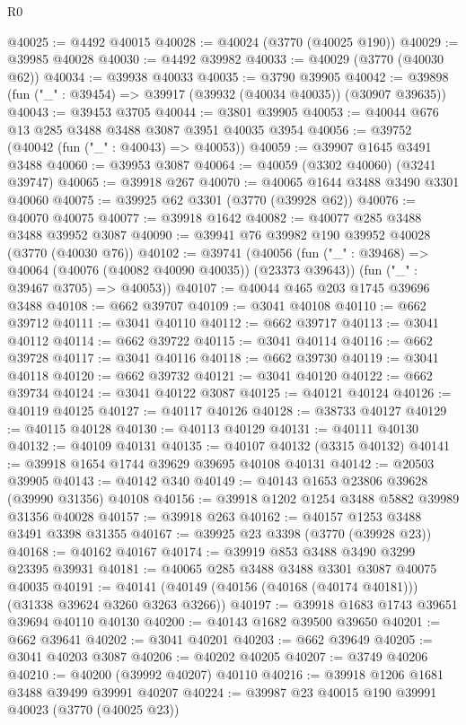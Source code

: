 \begin{lexlean}{R0}
\begin{coremodule}
@40025 := @4492 @40015
@40028 := @40024 (@3770 (@40025 @190))
@40029 := @39985 @40028
@40030 := @4492 @39982
@40033 := @40029 (@3770 (@40030 @62))
@40034 := @39938 @40033
@40035 := @3790 @39905
@40042 := @39898 (fun ("_" : @39454) => @39917 (@39932 (@40034 @40035)) (@30907 @39635))
@40043 := @39453 @3705
@40044 := @3801 @39905
@40053 := @40044 @676 @13 @285 @3488 @3488 @3087 @3951 @40035 @3954
@40056 := @39752 (@40042 (fun ("_" : @40043) => @40053))
@40059 := @39907 @1645 @3491 @3488
@40060 := @39953 @3087
@40064 := @40059 (@3302 @40060) (@3241 @39747)
@40065 := @39918 @267
@40070 := @40065 @1644 @3488 @3490 @3301 @40060
@40075 := @39925 @62 @3301 (@3770 (@39928 @62))
@40076 := @40070 @40075
@40077 := @39918 @1642
@40082 := @40077 @285 @3488 @3488 @39952 @3087
@40090 := @39941 @76 @39982 @190 @39952 @40028 (@3770 (@40030 @76))
@40102 := @39741
    (@40056
      (fun ("_" : @39468) => @40064 (@40076 (@40082 @40090 @40035)) (@23373 @39643))
      (fun ("_" : @39467 @3705) => @40053))
@40107 := @40044 @465 @203 @1745 @39696 @3488
@40108 := @662 @39707
@40109 := @3041 @40108
@40110 := @662 @39712
@40111 := @3041 @40110
@40112 := @662 @39717
@40113 := @3041 @40112
@40114 := @662 @39722
@40115 := @3041 @40114
@40116 := @662 @39728
@40117 := @3041 @40116
@40118 := @662 @39730
@40119 := @3041 @40118
@40120 := @662 @39732
@40121 := @3041 @40120
@40122 := @662 @39734
@40124 := @3041 @40122 @3087
@40125 := @40121 @40124
@40126 := @40119 @40125
@40127 := @40117 @40126
@40128 := @38733 @40127
@40129 := @40115 @40128
@40130 := @40113 @40129
@40131 := @40111 @40130
@40132 := @40109 @40131
@40135 := @40107 @40132 (@3315 @40132)
@40141 := @39918 @1654 @1744 @39629 @39695 @40108 @40131
@40142 := @20503 @39905
@40143 := @40142 @340
@40149 := @40143 @1653 @23806 @39628 (@39990 @31356) @40108
@40156 := @39918 @1202 @1254 @3488 @5882 @39989 @31356 @40028
@40157 := @39918 @263
@40162 := @40157 @1253 @3488 @3491 @3398 @31355
@40167 := @39925 @23 @3398 (@3770 (@39928 @23))
@40168 := @40162 @40167
@40174 := @39919 @853 @3488 @3490 @3299 @23395 @39931
@40181 := @40065 @285 @3488 @3488 @3301 @3087 @40075 @40035
@40191 := @40141 (@40149 (@40156 (@40168 (@40174 @40181))) (@31338 @39624 @3260 @3263 @3266))
@40197 := @39918 @1683 @1743 @39651 @39694 @40110 @40130
@40200 := @40143 @1682 @39500 @39650
@40201 := @662 @39641
@40202 := @3041 @40201
@40203 := @662 @39649
@40205 := @3041 @40203 @3087
@40206 := @40202 @40205
@40207 := @3749 @40206
@40210 := @40200 (@39992 @40207) @40110
@40216 := @39918 @1206 @1681 @3488 @39499 @39991 @40207
@40224 := @39987 @23 @40015 @190 @39991 @40023 (@3770 (@40025 @23))

\end{coremodule}
\end{lexlean}
